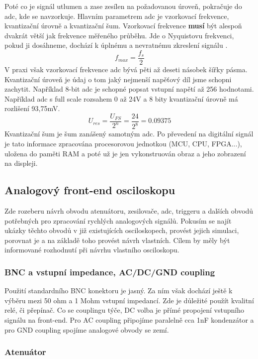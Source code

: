 \documentclass[12pt]{article}
\begin{document}
Poté co je signál utlumen
a zase zesílen na požadovanou úroveň, pokračuje do \acrshort{adc}, kde se navzorkuje.
Hlavním parametrem \acrshort{adc} je vzorkovací frekvence, kvantizační úrovně a kvantizační
šum. Vzorkovací frekvence \textbf{musí} být alespoň dvakrát větší jak frekvence měřeného
průběhu. Jde o Nyquistovu frekvenci, pokud ji dosáhneme, dochází k úplnému a nevratnému
zkreslení signálu \cite{AliasingADCsNot2015}. $$f_{max}=\frac{f_s}{2}$$ V praxi však vzorkovací
frekvence \acrshort{adc} bývá pěti až deseti násobek šířky pásma. Kvantizační úroveň je údaj
o tom jaký nejmenší napěťový díl jsme schopni zachytit. Například 8-bit \acrshort{adc} je
schopné popsat vstupní napětí až 256 hodnotami. Například \acrshort{adc} s full scale rozsahem
0 až 24V a 8 bity kvantizační úrovně má rozlišení 93,75mV.
$$U_{res}=\frac{U_{FS}}{2^n}=\frac{24}{2^8}=0.09375$$ Kvantizační šum je šum zanášený
samotným \acrshort{adc}. Po převedení na digitální signál je tato informace zpracována
procesorovou jednotkou (MCU, CPU, FPGA...), uložena do paměti RAM a poté už je jen vykonstruován
obraz a jeho zobrazení na displeji.

\subsection{Analogový front-end osciloskopu}

Zde rozeberu návrh obvodu atenuátoru, zesilovače, \acrshort{adc}, triggeru a dalších obvodů
potřebných pro zpracování rychlých analogových signálů. Pokusím se najít ukázky těchto obvodů
v již existujících osciloskopech, provést jejich simulaci, porovnat je a na základě toho
provést návrh vlastních. Cílem by měly být informované rozhodnutí při návrhu vlastního osciloskopu.

\subsubsection{BNC a vstupní impedance, AC/DC/GND coupling}

Použití standardního BNC konektoru je jasný. Za ním však dochází ještě k výběru mezi 50 ohm a 1 Mohm
vstupní impedancí. Zde je důležité použít kvalitní relé, či přepínač. Co se couplingu týče,
DC volba je přímé propojení vstupního signálu na front-end. Pro AC coupling připojíme paralelně cca
1nF kondenzátor a pro GND coupling spojíme analogové obvody se zemí.

\subsubsection{Atenuátor}
\end{document}
